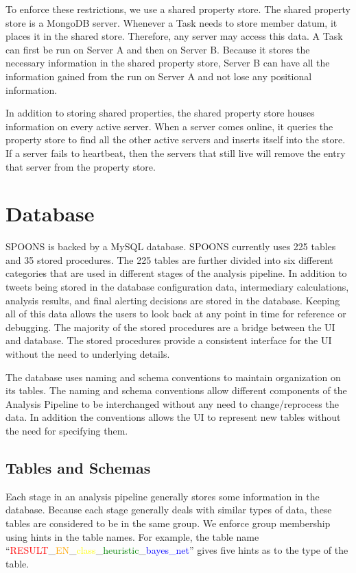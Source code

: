 \documentclass[12pt]{ucthesis}
\begin{document}
To enforce these restrictions, we use a shared property store. The shared property store is a MongoDB server.
Whenever a Task needs to store member datum, it places it in the shared store. Therefore, any server may access this data.
A Task can first be run on Server A and then on Server B. Because it stores the necessary information in the shared
property store, Server B can have all the information gained from the run on Server A and not lose any positional information.

In addition to storing shared properties, the shared property store houses information on every active server.
When a server comes online, it queries the property store to find all the other active servers and inserts itself into
the store. If a server fails to heartbeat, then the servers that still live will remove the entry that server from the property store.

\chapter{Database}
\label{arch-database}
SPOONS is backed by a MySQL database. SPOONS currently uses 225 tables and 35 stored procedures. The 225 tables are further divided into
six different categories that are used in different stages of the analysis pipeline. In addition to tweets being stored in the database
configuration data, intermediary calculations, analysis results, and final alerting decisions are stored in the database. Keeping all of this
data allows the users to look back at any point in time for reference or debugging. The majority of the stored procedures are a bridge between
the UI and database. The stored procedures provide a consistent interface for the UI without the need to underlying details.

The database uses naming and schema conventions to maintain organization on its tables. The naming and schema conventions allow different
components of the Analysis Pipeline to be interchanged without any need to change/reprocess the data. In addition the conventions allows the UI
to represent new tables without the need for specifying them.

\section{Tables and Schemas}
\label{arch-database-tables}
Each stage in an analysis pipeline generally stores some information in the database. Because each stage generally deals with similar
types of data, these tables are considered to be in the same group. We enforce group membership using hints in the table names. For example, the
table name ``\textcolor{red}{RESULT}\_\textcolor{orange}{EN}\_\textcolor{yellow}{class}\_\textcolor{green}{heuristic}\_\textcolor{blue}{bayes\_net}''
gives five hints as to the type of the table.
\end{document}
